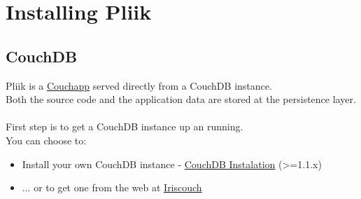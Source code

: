 
\section{Installing Pliik}


\subsection{CouchDB}
Pliik is a \href{http://wiki.couchapp.org}{Couchapp} served directly from a CouchDB instance.\\
Both the source code and the application data are stored at the persistence layer. \\ \\
First step is to get a CouchDB instance up an running.\\ 
You can choose to:
\begin{itemize}
\item Install your own CouchDB instance - \href{http://wiki.apache.org/couchdb/Installation}{CouchDB Instalation} (>=1.1.x)
\item ... or to get one from the web at \href{http://www.iriscouch.com/}{Iriscouch}
\end{itemize}


